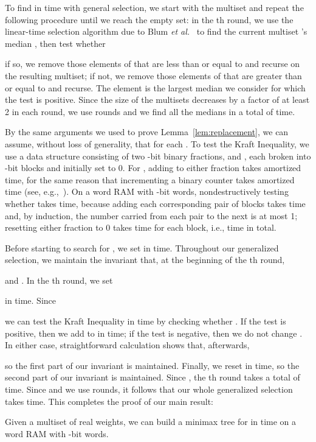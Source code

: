 \documentclass[runningheads]{llncs}
\begin{document}
To find  in  time with general selection, we start with the multiset  and repeat the following procedure until we reach the empty set: in the th round, we use the linear-time selection algorithm due to Blum {\it et al.}~\cite{BFP+73} to find the current multiset 's median , then test whether

if so, we remove those elements of  that are less than or equal to  and recurse on the resulting multiset; if not, we remove those elements of  that are greater than or equal to  and recurse.  The element  is the largest median we consider for which the test is positive.  Since the size of the multisets decreases by a factor of at least 2 in each round, we use  rounds and we find all the medians in a total of  time.

By the same arguments we used to prove Lemma~\ref{lem:replacement}, we can assume, without loss of generality, that  for each .  To test the Kraft Inequality, we use a data structure consisting of two -bit binary fractions,  and , each broken into -bit blocks and initially set to 0.  For , adding  to either fraction takes  amortized time, for the same reason that incrementing a binary counter takes  amortized time (see, e.g.,~\cite[Section 17.3]{CLRS01}).  On a word RAM with -bit words, nondestructively testing whether  takes  time, because adding each corresponding pair of blocks takes  time and, by induction, the number carried from each pair to the next is at most 1; resetting either fraction to 0 takes  time for each block, i.e.,  time in total.

Before starting to search for , we set  in  time.  Throughout our generalized selection, we maintain the invariant that, at the beginning of the th round,

and .  In the th round, we set

in  time.  Since

we can test the Kraft Inequality in  time by checking whether .  If the test is positive, then we add  to  in  time; if the test is negative, then we do not change .  In either case, straightforward calculation shows that, afterwards,

so the first part of our invariant is maintained.  Finally, we reset  in  time, so the second part of our invariant is maintained.  Since , the th round takes a total of  time.  Since  and we use  rounds, it follows that our whole generalized selection takes  time.  This completes the proof of our main result:

\begin{theorem} \label{thm:reals}
Given a multiset  of  real weights, we can build a minimax tree for  in  time on a word RAM with -bit words.
\end{theorem}



\end{document}
